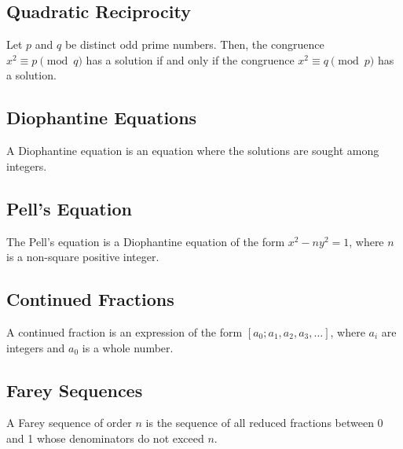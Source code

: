 \documentclass{article}
\begin{document}
\subsection{Quadratic Reciprocity}

\begin{theorem}
Let $p$ and $q$ be distinct odd prime numbers. Then, the congruence $x^2 \equiv p \pmod{q}$ has a solution if and only if the congruence $x^2 \equiv q \pmod{p}$ has a solution.
\end{theorem}


\subsection{Diophantine Equations}

\begin{definition}
A Diophantine equation is an equation where the solutions are sought among integers.
\end{definition}

\subsection{Pell's Equation}

\begin{definition}
The Pell's equation is a Diophantine equation of the form $x^2 - ny^2 = 1$, where $n$ is a non-square positive integer.
\end{definition}

\subsection{Continued Fractions}

\begin{definition}
A continued fraction is an expression of the form $[a_0; a_1, a_2, a_3, \ldots]$, where $a_i$ are integers and $a_0$ is a whole number.
\end{definition}

\subsection{Farey Sequences}

\begin{definition}
A Farey sequence of order $n$ is the sequence of all reduced fractions between 0 and 1 whose denominators do not exceed $n$.
\end{definition}
\end{document}
